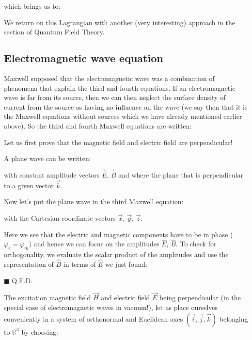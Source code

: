 	which brings us to:
	
	\begin{tcolorbox}[title=Remark,colframe=black,arc=10pt]
	We return on this Lagrangian with another (very interesting) approach in the section of Quantum Field Theory.
	\end{tcolorbox}
	
	\pagebreak
	\subsection{Electromagnetic wave equation}\label{electromagnetic wave equation}
	Maxwell supposed that the electromagnetic wave was a combination of phenomena that explain the third and fourth equations. If an electromagnetic wave is far from its source, then we can then neglect the surface density of current from the source as having no influence on the wave (we say then that it is the Maxwell equations without sources which we have already mentioned earlier above). So the third and fourth Maxwell equations are written:
	
	Let us first prove that the magnetic field and electric field are perpendicular!\label{perpendicularity electric magnetic field wave}
	\begin{dem}
	A plane wave can be written:
	
	with constant amplitude vectors $\hat{E}$, $\hat{B}$ and where the plane that is perpendicular to a given vector $\vec{k}$.

	Now let's put the plane wave in the third Maxwell equation:
	
	with the Cartesian coordinate vectors $\vec{x}$, $\vec{y}$, $\vec{z}$.
	
	Here we see that the electric and magnetic components have to be in phase ($\varphi_e=\varphi_m$) and hence we can focus on the amplitudes $\hat{E}$, $\hat{B}$. To check for orthogonality, we evaluate the scalar product of the amplitudes and use the representation of $\hat{B}$ in terms of $\hat{E}$ we just found:
	
	\begin{flushright}
		$\blacksquare$  Q.E.D.
	\end{flushright}
	\end{dem} 
	The excitation magnetic field $\vec{H}$ and electric field  $\vec{E}$ being perpendicular (in the special case of electromagnetic waves in vacuum!), let us place ourselves conveniently in a system of orthonormal and Euclidean axes $(\vec{i},\vec{j},\vec{k})$ belonging to $\mathbb{R}^3$ by choosing:
	
